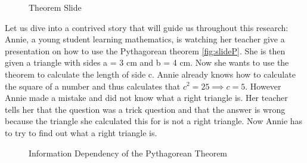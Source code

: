 \documentclass[twoside, 12pt]{article}
\begin{document}
\begin{figure}
\vspace{-28pt}
  \begin{center}
  \end{center}
\vspace{-20pt}
  \caption{Theorem Slide}
  \label{fig:slideP}
\vspace{-15pt}
\end{figure}

Let us dive into a contrived story that will guide us throughout this research: Annie, a young student learning mathematics, is watching her teacher give a presentation on how to use the Pythagorean theorem \autoref{fig:slideP}. She is then given a triangle with sides a = 3 cm and b = 4 cm. Now she wants to use the theorem to calculate the length of side c. Annie already knows how to calculate the square of a number and thus calculates that $c^2 = 25 \implies c = 5$. However Annie made a mistake and did not know what a right triangle is. Her teacher tells her that the question was a trick question and that the answer is wrong because the triangle she calculated this for is not a right triangle. Now Annie has to try to find out what a right triangle is.\\

\begin{figure}
\vspace{-28pt}
  \begin{center}
  \end{center}
\vspace{-20pt}
  \caption{Information Dependency of the Pythagorean Theorem}
  \label{fig:deppyg}
\vspace{-10pt}
\end{figure}
\end{document}
